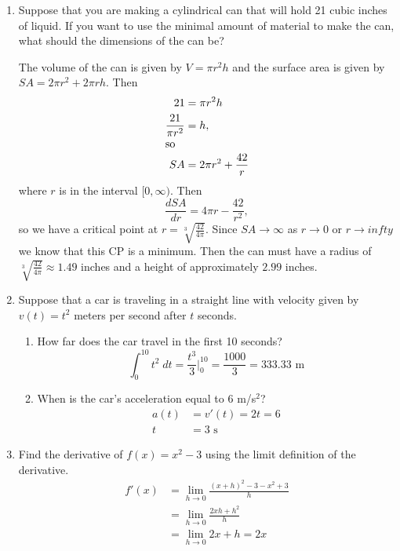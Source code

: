 \documentclass[11pt]{article}
\begin{document}
\begin{enumerate}
  \newpage

\item Suppose that you are making a cylindrical can that will hold 21
  cubic inches of liquid.  If you want to use the minimal amount of
  material to make the can, what should the dimensions of the can be?

  \vfill 
  
  The volume of the can is given by $V=\pi r^2h$ and the
  surface area is given by $SA=2\pi r^2+2\pi r h$.  Then
  \begin{align*}
    21 &= \pi r^2 h\\
    \frac{21}{\pi r^2} &= h,\\
    \intertext{so}
    SA &= 2\pi r^2 + \dfrac{42}{r}
  \end{align*}
  where $r$ is in the interval $[0,\infty)$. Then
  \[
  \frac{dSA}{dr} = 4\pi r-\frac{42}{r^2},
  \]
  so we have a critical point at $r=\sqrt[3]{\frac{42}{4\pi}}$.  Since
  $SA\to \infty$ as $r\to 0$ or $r\to infty$ we know that this CP is a
  minimum.  Then the can must have a radius of
  $\sqrt[3]{\frac{42}{4\pi}}\approx 1.49$ inches and a height of
  approximately $2.99$ inches.

  \vfill \newpage

\item Suppose that a car is traveling in a straight line with velocity
  given by $v(t)=t^2$ meters per second after $t$ seconds.
  \begin{enumerate}
  \item How far does the car travel in the first 10 seconds?
    \vfill
    \[
    \int_0^{10} t^2\;dt =
    \frac{t^3}{3}\Big\vert_0^{10}=\frac{1000}{3}=333.33\text{ m}
    \]
    \vfill
  \item When is the car's acceleration equal to $6$ m/s$^2$?
    \vfill
    \begin{align*}
      a(t) &= v'(t) = 2t = 6\\
      t &= 3\text{ s}
    \end{align*}
    \vfill
  \end{enumerate}

  \newpage

\item Find the derivative of $f(x)=x^2-3$ using the limit definition
  of the derivative.
  \vfill
  \begin{align*}
    f'(x) &=\lim_{h\to 0} \frac{(x+h)^2-3-x^2+3}{h} \\
    &=\lim_{h\to 0} \frac{2xh+h^2}{h}\\
    &= \lim_{h\to 0} 2x+h = 2x
  \end{align*}
  \vfill


\end{enumerate}
\end{document}
